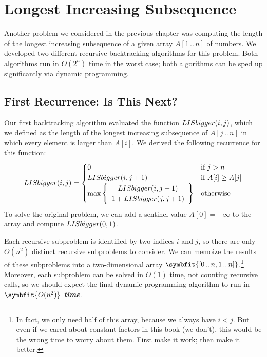\section{Longest Increasing Subsequence}
\label{sec:3.6}

Another problem we considered in the previous chapter was computing the length of the longest increasing subsequence of a given array $A[1\,..\,n]$ of numbers.
We developed two different recursive backtracking algorithms for this problem.
Both algorithms run in $O(2^n)$ time in the worst case; both algorithms can be sped up significantly via dynamic programming.

\subsection{First Recurrence: Is This Next?}

Our first backtracking algorithm evaluated the function $LISbigger(i, j)$, which we defined as the length of the longest increasing subsequence of $A[j\,..\,n]$ in which every element is larger than $A[i]$.
We derived the following recurrence for this function:
\[
LISbigger(i, j) = \begin{cases}
0 & \text{if } j > n\\
LISbigger(i, j+1) & \text{if } A[i] \ge A[j]\\
\max\left\{\begin{array}{c} LISbigger(i, j+1)\\ 1 + LISbigger(j, j+1) \end{array}\right\} & \text{otherwise}
\end{cases}
\]
To solve the original problem, we can add a sentinel value $A[0] = -\infty$ to the array and compute $LISbigger(0, 1)$.

Each recursive subproblem is identified by two indices $i$ and $j$, so there are only $O(n^2)$ distinct recursive subproblems to consider.
We can memoize the results of these subproblems into a two-dimensional array {\bfseries{}}$\symbfit{[0\,..\,n, 1\,..\,n]}$.\footnote{In fact, we only need half of this array, because we always have $i < j$. But even if we cared about constant factors in this book (we don’t), this would be the wrong time to worry about them. First make it work; then make it better.}
Moreover, each subproblem can be solved in $O(1)$ time, not counting recursive calls, so we should expect the final dynamic programming algorithm to run in \textbf{\textit{$\symbfit{O(n^2)}$ time}}.

